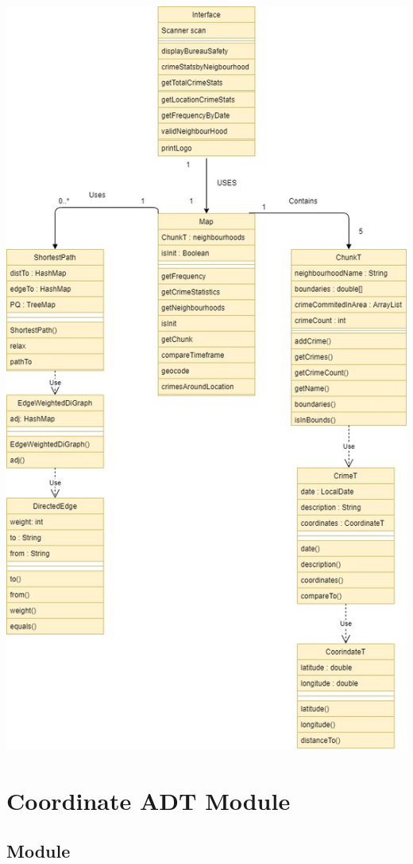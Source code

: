 \documentclass[12pt]{article}
\begin{document}
\includegraphics[scale = 0.5]{UML.jpg}

\section* {Coordinate ADT Module}

\subsection*{Module}
\end{document}
